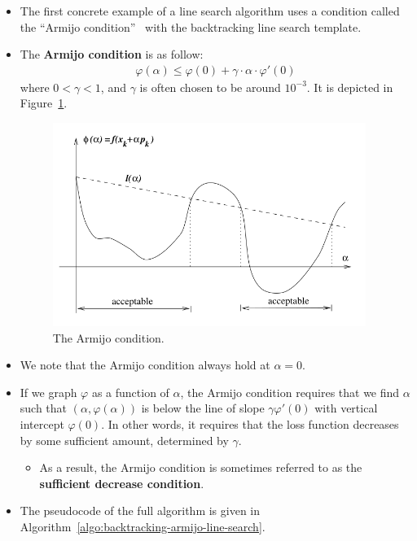 \documentclass[10pt]{article}
\begin{document}
\begin{itemize}
    \item The first concrete example of a line search algorithm uses a condition called the ``Armijo condition''~\cite{Norcedal:2006} with the backtracking line search template.
    
    \item The {\bf Armijo condition} is as follow:
    \begin{align*}
        \varphi(\alpha) \leq \varphi(0) + \gamma \cdot \alpha \cdot \varphi'(0)
    \end{align*}
    where $0 < \gamma < 1$, and $\gamma$ is often chosen to be around $10^{-3}$. It is depicted in Figure~\ref{fig:armijo-condition}.

    \begin{figure}
        \centering
        \includegraphics[width=4in]{armijo.png}
        \caption{The Armijo condition.}
        \label{fig:armijo-condition}        
    \end{figure}

    \item We note that the Armijo condition always hold at $\alpha = 0$.

    \item If we graph $\varphi$ as a function of $\alpha$, the Armijo condition requires that we find $\alpha$ such that $(\alpha, \varphi(\alpha))$ is below the line of slope $\gamma \varphi'(0)$ with vertical intercept $\varphi(0)$. In other words, it requires that the loss function decreases by some sufficient amount, determined by $\gamma$.
    \begin{itemize}
        \item As a result, the Armijo condition is sometimes referred to as the {\bf sufficient decrease condition}.        
    \end{itemize}

    \item The pseudocode of the full algorithm is given in Algorithm~\ref{algo:backtracking-armijo-line-search}.
    

\end{itemize}
\end{document}
